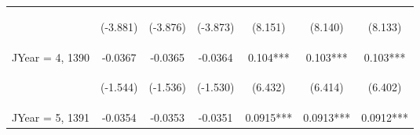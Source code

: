 \documentclass[]{article}
\begin{document}
\begin{center}
\begin{tabular}{lcccccc}
        \vspace{4pt}     & \begin{footnotesize}(-3.881)\end{footnotesize} & \begin{footnotesize}(-3.876)\end{footnotesize} & \begin{footnotesize}(-3.873)\end{footnotesize} & \begin{footnotesize}(8.151)\end{footnotesize}  & \begin{footnotesize}(8.140)\end{footnotesize}  & \begin{footnotesize}(8.133)\end{footnotesize}  \\
        JYear = 4, 1390  & -0.0367                                        & -0.0365                                        & -0.0364                                        & 0.104***                                       & 0.103***                                       & 0.103***                                       \\
        \vspace{4pt}     & \begin{footnotesize}(-1.544)\end{footnotesize} & \begin{footnotesize}(-1.536)\end{footnotesize} & \begin{footnotesize}(-1.530)\end{footnotesize} & \begin{footnotesize}(6.432)\end{footnotesize}  & \begin{footnotesize}(6.414)\end{footnotesize}  & \begin{footnotesize}(6.402)\end{footnotesize}  \\
        JYear = 5, 1391  & -0.0354                                        & -0.0353                                        & -0.0351                                        & 0.0915***                                      & 0.0913***                                      & 0.0912***                                      \\

\end{tabular}
\end{center}
\end{document}
